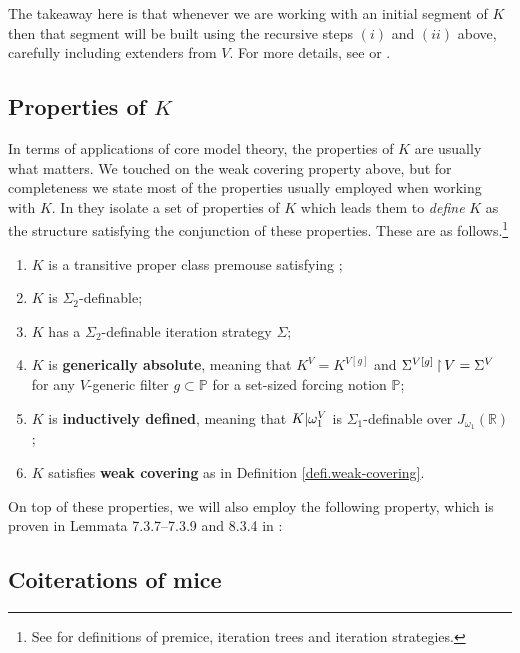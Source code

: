 \documentclass[../../main]{subfiles}
\begin{document}
\qquad The takeaway here is that whenever we are working with an initial segment of $K$ then that segment will be built using the recursive steps $(i)$ and $(ii)$ above, carefully including extenders from $V$. For more details, see \cite{Kwithoutmeasurable} or \cite{MSc}.

\subsection{Properties of $K$}

In terms of applications of core model theory, the properties of $K$ are usually what matters. We touched on the weak covering property above, but for completeness we state most of the properties usually employed when working with $K$. In \cite{Kwithoutmeasurable} they isolate a set of properties of $K$ which leads them to \textit{define} $K$ as the structure satisfying the conjunction of these properties. These are as follows.\footnote{See \cite{steel2010outline} for definitions of premice, iteration trees and iteration strategies.}

\begin{enumerate}
  \item $K$ is a transitive proper class premouse satisfying \zfc;
  \item $K$ is $\Sigma_2$-definable;
  \item $K$ has a $\Sigma_2$-definable iteration strategy $\Sigma$;
  \item $K$ is \textbf{generically absolute}, meaning that $K^V=K^{V[g]}$ and $\Sigma^{V[g]}\operatorname{\upharpoonright} V=\Sigma^V$ for any $V$-generic filter $g\subset\mathbb P$ for a set-sized forcing notion $\mathbb P$;
  \item $K$ is \textbf{inductively defined}, meaning that $K|\omega_1^V$ is $\Sigma_1$-definable over $J_{\omega_1}(\mathbb R)$;
  \item $K$ satisfies \textbf{weak covering} as in Definition \ref{defi.weak-covering}.\\
\end{enumerate}

On top of these properties, we will also employ the following property, which is proven in Lemmata 7.3.7--7.3.9 and 8.3.4 in \cite{Zeman}:


\subsection{Coiterations of mice}
\end{document}
